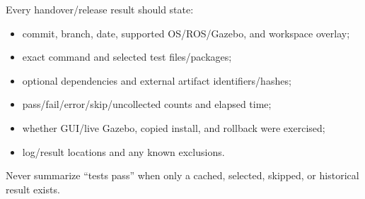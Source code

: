 Every handover/release result should state:

\begin{itemize}
  \item commit, branch, date, supported OS/ROS/Gazebo, and workspace overlay;
  \item exact command and selected test files/packages;
  \item optional dependencies and external artifact identifiers/hashes;
  \item pass/fail/error/skip/uncollected counts and elapsed time;
  \item whether GUI/live Gazebo, copied install, and rollback were exercised;
  \item log/result locations and any known exclusions.
\end{itemize}

Never summarize ``tests pass'' when only a cached, selected, skipped, or
historical result exists.
